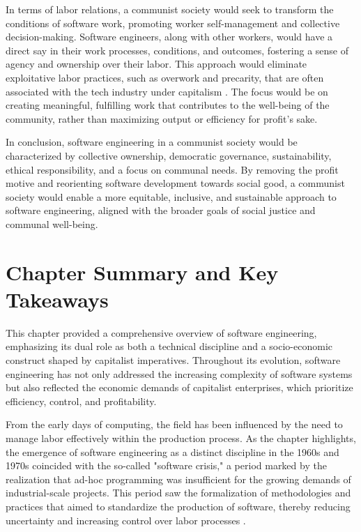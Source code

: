 \begin{refsection}
In terms of labor relations, a communist society would seek to transform the conditions of software work, promoting worker self-management and collective decision-making. Software engineers, along with other workers, would have a direct say in their work processes, conditions, and outcomes, fostering a sense of agency and ownership over their labor. This approach would eliminate exploitative labor practices, such as overwork and precarity, that are often associated with the tech industry under capitalism \cite[pp.~231-233]{scholz2016platform}. The focus would be on creating meaningful, fulfilling work that contributes to the well-being of the community, rather than maximizing output or efficiency for profit’s sake.

In conclusion, software engineering in a communist society would be characterized by collective ownership, democratic governance, sustainability, ethical responsibility, and a focus on communal needs. By removing the profit motive and reorienting software development towards social good, a communist society would enable a more equitable, inclusive, and sustainable approach to software engineering, aligned with the broader goals of social justice and communal well-being.

\section{Chapter Summary and Key Takeaways}

This chapter provided a comprehensive overview of software engineering, emphasizing its dual role as both a technical discipline and a socio-economic construct shaped by capitalist imperatives. Throughout its evolution, software engineering has not only addressed the increasing complexity of software systems but also reflected the economic demands of capitalist enterprises, which prioritize efficiency, control, and profitability.

From the early days of computing, the field has been influenced by the need to manage labor effectively within the production process. As the chapter highlights, the emergence of software engineering as a distinct discipline in the 1960s and 1970s coincided with the so-called "software crisis," a period marked by the realization that ad-hoc programming was insufficient for the growing demands of industrial-scale projects. This period saw the formalization of methodologies and practices that aimed to standardize the production of software, thereby reducing uncertainty and increasing control over labor processes \cite[pp.~27-29]{bollier2003silent}. 


\end{refsection}
